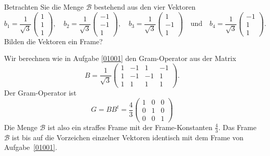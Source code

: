 Betrachten Sie die Menge $\mathcal{B}$ bestehend aus den vier Vektoren
\[
b_1
=
\frac{1}{\sqrt{3}}
\begin{pmatrix}
1\\1\\1
\end{pmatrix},\quad
b_2
=
\frac{1}{\sqrt{3}}
\begin{pmatrix}
-1\\-1\\1
\end{pmatrix},\quad
b_3
=
\frac{1}{\sqrt{3}}
\begin{pmatrix}
1\\-1\\1
\end{pmatrix}
\quad\text{und}\quad
b_4
=
\frac{1}{\sqrt{3}}
\begin{pmatrix}
-1\\1\\1
\end{pmatrix}.
\]
Bilden die Vektoren ein Frame?

\begin{loesung}
Wir berechnen wie in Aufgabe \ref{01001} den Gram-Operator aus der
Matrix
\[
B
=
\frac{1}{\sqrt{3}}
\begin{pmatrix}
1&-1& 1&-1\\
1&-1&-1& 1\\
1& 1& 1& 1
\end{pmatrix}.
\]
Der Gram-Operator ist
\[
G=BB^t
=
\frac43
\begin{pmatrix}
1&0&0\\
0&1&0\\
0&0&1
\end{pmatrix}
\]
Die Menge $\mathcal{B}$ ist also ein straffes Frame mit der Frame-Konstanten
$\frac43$.
Das Frame $\mathcal{B}$ ist bis auf die Vorzeichen einzelner Vektoren
identisch mit dem Frame von Aufgabe~\ref{01001}.
\end{loesung}


